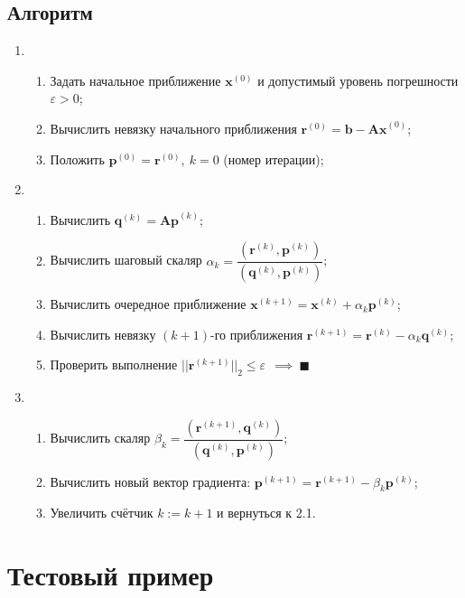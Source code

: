 \subsection{Алгоритм}
\begin{enumerate}
    \item \begin{enumerate}
        \item Задать начальное приближение $\mathbf{x}^{(0)}$ и допустимый уровень погрешности $\varepsilon>0$;
        \item Вычислить невязку начального приближения $\mathbf{r}^{(0)}=\mathbf{b-Ax}^{(0)}$;
        \item Положить $\mathbf{p}^{(0)}=\mathbf{r}^{(0)},~k=0$ (номер итерации);
    \end{enumerate}
    \item \begin{enumerate}
        \item Вычислить $\mathbf{q}^{(k)}=\mathbf{Ap}^{(k)}$;
        \item Вычислить шаговый скаляр $\alpha_k=\dfrac{(\mathbf{r}^{(k)}, \mathbf{p}^{(k)})}{(\mathbf{q}^{(k)}, \mathbf{p}^{(k)})}$;
        \item Вычислить очередное приближение $\mathbf{x}^{(k+1)}=\mathbf{x}^{(k)}+\alpha_k\mathbf{p}^{(k)}$;
        \item Вычислить невязку $(k+1)$-го приближения $\mathbf{r}^{(k+1)}=\mathbf{r}^{(k)}-\alpha_k\mathbf{q}^{(k)}$;
        \item Проверить выполнение $||\mathbf{r}^{(k+1)}||_2 \le \varepsilon ~~\implies ~ \blacksquare$
    \end{enumerate}
    \item \begin{enumerate}
        \item Вычислить скаляр $\beta_k=\dfrac{(\mathbf{r}^{(k+1)}, \mathbf{q}^{(k)})}{(\mathbf{q}^{(k)}, \mathbf{p}^{(k)})}$;
        \item Вычислить новый вектор градиента: $\mathbf{p}^{(k+1)}=\mathbf{r}^{(k+1)}-\beta_k\mathbf{p}^{(k)}$;
        \item Увеличить счётчик $k:=k+1$ и вернуться к 2.1.
    \end{enumerate}
\end{enumerate}

\clearpage
\section{Тестовый пример}
